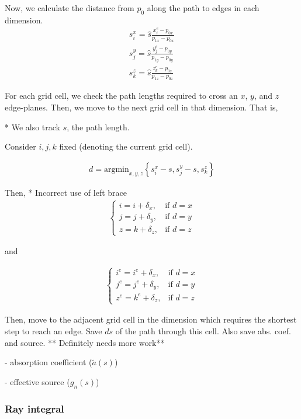 Now, we calculate the distance from $p_0$ along the path to edges in each dimension.
\begin{align}
  s_i^x = \hat{s}\frac{x_i^e-p_{0x}}{p_{1x}-p_{0x}} \\
  s_j^y = \hat{s}\frac{y_j^e-p_{0y}}{p_{1y}-p_{0y}} \\
  s_k^z = \hat{s}\frac{z_k^e-p_{0z}}{p_{1z}-p_{0z}}
\end{align}

For each grid cell, we check the path lengths required to cross an $x$, $y$, and
$z$ edge-planes.
Then, we move to the next grid cell in that dimension.
That is,

* We also track $s$, the path length.

Consider $i,j,k$ fixed (denoting the current grid cell).

\begin{align}  
  d = \mbox{argmin}_{x,y,z} \left\{ s_i^x-s, s_j^y-s, s_k^z \right\}
\end{align}

Then,
* Incorrect use of left brace
\begin{align}
  \begin{cases}
    i = i+\delta_x, & \mbox{if } d=x \\
    j = j+\delta_y, & \mbox{if } d=y \\
    z = k+\delta_z, & \mbox{if } d=z
  \end{cases}
\end{align}

and

\begin{align}
  \begin{cases}
    i^e = i^e+\delta_x, & \mbox{if } d=x \\
    j^e = j^e+\delta_y, & \mbox{if } d=y \\
    z^e = k^e+\delta_z, & \mbox{if } d=z
  \end{cases}
\end{align}


Then, move to the adjacent grid cell in the dimension which requires the shortest
step to reach an edge. Save $ds$ of the path through this cell. Also save abs.
coef. and source.
** Definitely needs more work**

- absorption coefficient ($\tilde{a}(s)$)

- effective source ($g_n(s)$)

\subsubsection{Ray integral}

